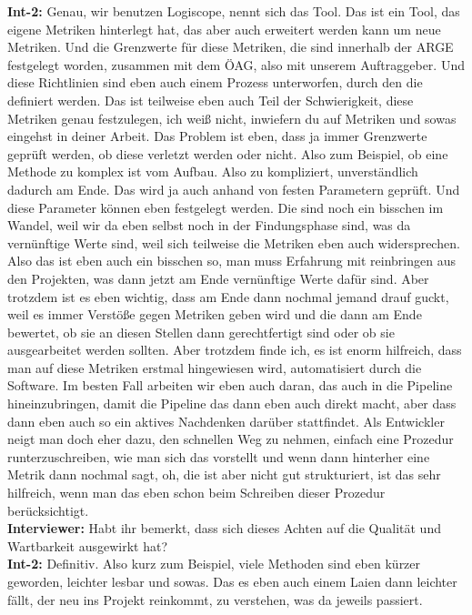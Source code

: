 \textbf{Int-2:} Genau, wir benutzen Logiscope, nennt sich das Tool. Das ist ein Tool, das eigene Metriken hinterlegt hat, das aber auch erweitert werden kann um neue Metriken. Und die Grenzwerte für diese Metriken, die sind innerhalb der ARGE festgelegt worden, zusammen mit dem ÖAG, also mit unserem Auftraggeber. Und diese Richtlinien sind eben auch einem Prozess unterworfen, durch den die definiert werden. Das ist teilweise eben auch Teil der Schwierigkeit, diese Metriken genau festzulegen, ich weiß nicht, inwiefern du auf Metriken und sowas eingehst in deiner Arbeit. Das Problem ist eben, dass ja immer Grenzwerte geprüft werden, ob diese verletzt werden oder nicht. Also zum Beispiel, ob eine Methode zu komplex ist vom Aufbau. Also zu kompliziert, unverständlich dadurch am Ende. Das wird ja auch anhand von festen Parametern geprüft. Und diese Parameter können eben festgelegt werden. Die sind noch ein bisschen im Wandel, weil wir da eben selbst noch in der Findungsphase sind, was da vernünftige Werte sind, weil sich teilweise die Metriken eben auch widersprechen. Also das ist eben auch ein bisschen so, man muss Erfahrung mit reinbringen aus den Projekten, was dann jetzt am Ende vernünftige Werte dafür sind. Aber trotzdem ist es eben wichtig, dass am Ende dann nochmal jemand drauf guckt, weil es immer Verstöße gegen Metriken geben wird und die dann am Ende bewertet, ob sie an diesen Stellen dann gerechtfertigt sind oder ob sie ausgearbeitet werden sollten. Aber trotzdem finde ich, es ist enorm hilfreich, dass man auf diese Metriken erstmal hingewiesen wird, automatisiert durch die Software. Im besten Fall arbeiten wir eben auch daran, das auch in die Pipeline hineinzubringen, damit die Pipeline das dann eben auch direkt macht, aber dass dann eben auch so ein aktives Nachdenken darüber stattfindet. Als Entwickler neigt man doch eher dazu, den schnellen Weg zu nehmen, einfach eine Prozedur runterzuschreiben, wie man sich das vorstellt und wenn dann hinterher eine Metrik dann nochmal sagt, oh, die ist aber nicht gut strukturiert, ist das sehr hilfreich, wenn man das eben schon beim Schreiben dieser Prozedur berücksichtigt. \\
\textbf{Interviewer:} Habt ihr bemerkt, dass sich dieses Achten auf die Qualität und Wartbarkeit ausgewirkt hat?\\
\textbf{Int-2:} Definitiv. Also kurz zum Beispiel, viele Methoden sind eben kürzer geworden, leichter lesbar und sowas. Das es eben auch einem Laien dann leichter fällt, der neu ins Projekt reinkommt, zu verstehen, was da jeweils passiert. \\

